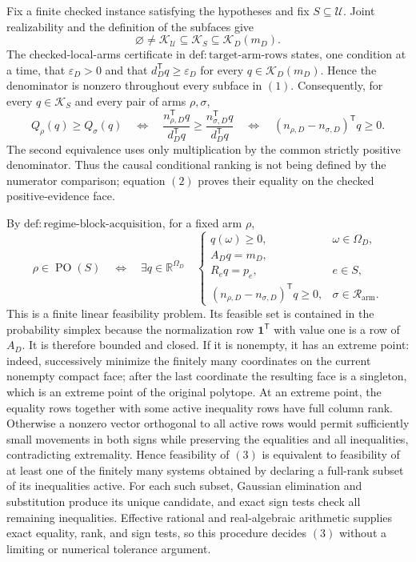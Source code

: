 Fix a finite checked instance satisfying the hypotheses and fix
\(S\subseteq\mathcal U\).  Joint realizability and the definition of the
subfaces give
\[
\varnothing\ne\mathcal K_{\mathcal U}\subseteq\mathcal K_S
\subseteq\mathcal K_D(m_D).
\tag{1}
\]
The checked-local-arms certificate in
\(\mathrm{def:target\text{-}arm\text{-}rows}\) states, one condition at a
time, that \(\varepsilon_D>0\) and that
\(d_D^{\mathsf T}q\geq\varepsilon_D\) for every
\(q\in\mathcal K_D(m_D)\).  Hence the denominator is nonzero throughout
every subface in \((1)\).  Consequently, for every
\(q\in\mathcal K_S\) and every pair of arms \(\rho,\sigma\),
\[
Q_\rho(q)\geq Q_\sigma(q)
\quad\Longleftrightarrow\quad
\frac{n_{\rho,D}^{\mathsf T}q}{d_D^{\mathsf T}q}
\geq
\frac{n_{\sigma,D}^{\mathsf T}q}{d_D^{\mathsf T}q}
\quad\Longleftrightarrow\quad
(n_{\rho,D}-n_{\sigma,D})^{\mathsf T}q\geq0.
\tag{2}
\]
The second equivalence uses only multiplication by the common strictly
positive denominator.  Thus the causal conditional ranking is not being
defined by the numerator comparison; equation \((2)\) proves their equality
on the checked positive-evidence face.

By \(\mathrm{def:regime\text{-}block\text{-}acquisition}\), for a fixed
arm \(\rho\),
\[
\rho\in\operatorname{PO}(S)
\quad\Longleftrightarrow\quad
\exists q\in\mathbb R^{\Omega_D}\quad
\begin{cases}
q(\omega)\geq0,&\omega\in\Omega_D,\\
A_Dq=m_D,\\
R_eq=p_e,&e\in S,\\
(n_{\rho,D}-n_{\sigma,D})^{\mathsf T}q\geq0,
&\sigma\in\mathcal R_{\mathrm{arm}}.
\end{cases}
\tag{3}
\]
This is a finite linear feasibility problem.  Its feasible set is contained
in the probability simplex because the normalization row
\(\mathbf 1^{\mathsf T}\) with value one is a row of \(A_D\).  It is
therefore bounded and closed.  If it is nonempty, it has an extreme point:
indeed, successively minimize the finitely many coordinates on the current
nonempty compact face; after the last coordinate the resulting face is a
singleton, which is an extreme point of the original polytope.  At an extreme
point, the equality rows together with some active inequality rows have full
column rank.  Otherwise a nonzero vector orthogonal to all active rows would
permit sufficiently small movements in both signs while preserving the
equalities and all inequalities, contradicting extremality.  Hence feasibility
of \((3)\) is equivalent to feasibility of at least one of the finitely many
systems obtained by declaring a full-rank subset of its inequalities active.
For each such subset, Gaussian elimination and substitution produce its unique
candidate, and exact sign tests check all remaining inequalities.  Effective
rational and real-algebraic arithmetic supplies exact equality, rank, and sign
tests, so this procedure decides \((3)\) without a limiting or numerical
tolerance argument.


